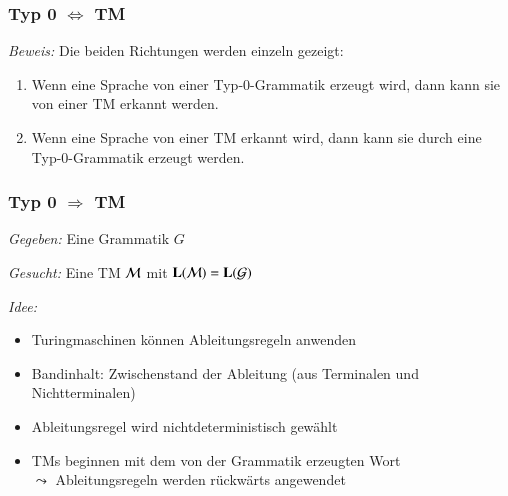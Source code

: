 \documentclass[onlymath]{beamer}
\begin{document}
\begin{frame}\frametitle{Typ 0 $\Leftrightarrow$ TM}

\medskip

\emph{Beweis:} Die beiden Richtungen werden einzeln gezeigt:
\begin{enumerate}[(1)]
\item Wenn eine Sprache von einer Typ-0-Grammatik erzeugt wird, dann kann sie von einer TM erkannt werden.
\item Wenn eine Sprache von einer TM erkannt wird, dann kann sie durch eine Typ-0-Grammatik erzeugt werden.
\end{enumerate}

\end{frame}

\begin{frame}\frametitle{Typ 0 $\Rightarrow$ TM}

\emph{Gegeben:} Eine Grammatik $G$
\medskip

\emph{Gesucht:} Eine TM $\mathcal{M}$ mit $\textbf{\textcolor{black}{L}}(\mathcal{M})=\textbf{\textcolor{black}{L}}(\mathcal{G})$
\medskip\pause

\emph{Idee:}
\begin{itemize}
\item Turingmaschinen können Ableitungsregeln anwenden
\item Bandinhalt: Zwischenstand der Ableitung (aus Terminalen und Nichtterminalen)
\item Ableitungsregel wird nichtdeterministisch gewählt
\item TMs beginnen mit dem von der Grammatik erzeugten Wort\\$\leadsto$ Ableitungsregeln werden rückwärts angewendet
\end{itemize}

\end{frame}
\end{document}
